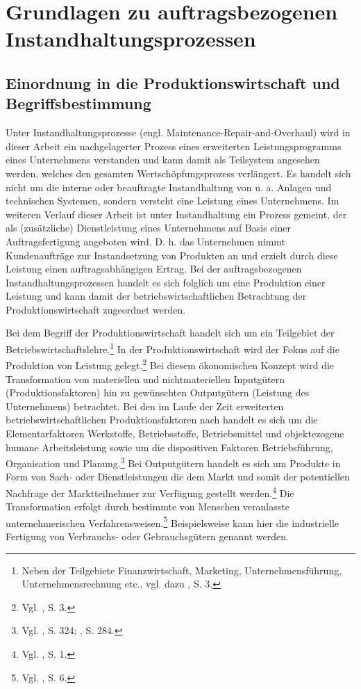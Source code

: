 \chapter{Grundlagen zu auftragsbezogenen Instandhaltungsprozessen}\label{Instandhaltung}
\setcounter{footnote}{2}  %

\section{Einordnung in die Produktionswirtschaft und Begriffsbestimmung}

Unter Instandhaltungsprozesse (engl. Maintenance-Repair-and-Overhaul) wird in dieser Arbeit ein nachgelagerter Prozess eines erweiterten Leistungsprogramms eines Unternehmens verstanden und kann damit als Teilsystem angesehen werden, welches den gesamten Wertschöpfungsprozess verlängert. Es handelt sich nicht um die interne oder beauftragte Instandhaltung von u. a. Anlagen und technischen Systemen, sondern versteht eine Leistung eines Unternehmens. Im weiteren Verlauf dieser Arbeit ist unter Instandhaltung ein Prozess gemeint, der als (zusätzliche) Dienstleistung eines Unternehmens auf Basis einer Auftragsfertigung angeboten wird. D. h. das Unternehmen nimmt Kundenaufträge zur Instandsetzung von Produkten an und erzielt durch diese Leistung einen auftragsabhängigen Ertrag. Bei der auftragsbezogenen Instandhaltungsprozessen handelt es sich folglich um eine Produktion einer Leistung und kann damit der betriebswirtschaftlichen Betrachtung der Produktionswirtschaft zugeordnet werden.

Bei dem Begriff der Produktionswirtschaft handelt sich um ein Teilgebiet der Betriebswirtschaftslehre.\footnote{Neben der Teilgebiete Finanzwirtschaft, Marketing, Unternehmensführung, Unternehmensrechnung etc., vgl. dazu \cite{Dyckhoff2010}, S. 3.} In der Produktionswirtschaft wird der Fokus auf die Produktion von Leistung gelegt.\footnote{Vgl. \cite{Dyckhoff2010}, S. 3.} Bei diesem ökonomischen Konzept wird die Transformation von materiellen und nichtmateriellen Inputgütern (Produktionsfaktoren) hin zu gewünschten Outputgütern (Leistung des Unternehmens) betrachtet. Bei den im Laufe der Zeit erweiterten betriebswirtschaftlichen Produktionsfaktoren nach \citet[S. 71]{Gutenberg:1959aa} handelt es sich um die Elementarfaktoren Werkstoffe, Betriebsstoffe, Betriebsmittel und objektezogene humane Arbeitsleistung sowie um die dispositiven Faktoren Betriebsführung, Organisation und Planung.\footnote{Vgl. \cite{Schubert:2005aa}, S. 324; \cite{Weber:1999aa}, S. 284.} Bei Outputgütern handelt es sich um Produkte in Form von Sach- oder Dienstleistungen die dem Markt und somit der potentiellen Nachfrage der Marktteilnehmer zur Verfügung gestellt werden.\footnote{Vgl. \cite{Schmidt:2012aa}, S. 1.} Die Transformation erfolgt durch bestimmte von Menschen veranlasste unternehmerischen Verfahrensweisen.\footnote{Vgl. \cite{tempelmeier1994produktion}, S. 6.} Beispielsweise kann hier die industrielle Fertigung von Verbrauchs- oder Gebrauchsgütern genannt werden.

